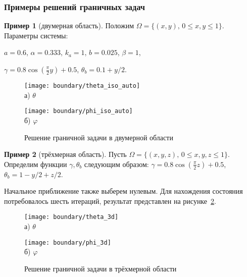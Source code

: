 \begin{frame}
    \frametitle{Примеры решений граничных задач}
    \textbf{Пример 1} (двумерная область).
    Положим $\Omega=\{(x,y),\, 0 \leq x,y \leq 1 \}$.
    Параметры системы:

    $a = 0.6$,
    $\alpha = 0.333$,
    $k_a = 1$,
    $b = 0.025$,
    $\beta = 1$,

    $\gamma = 0.8 \cos\left(\frac{\pi}{2} y\right) + 0.5$,
    $\theta_b = 0.1 + y / 2$.
    \begin{figure}[h!t]
        \begin{minipage}[b][][b]{0.49\linewidth}
            \centering
            \texttt{[image: boundary/theta\_iso\_auto]} \\ а) $\theta$
        \end{minipage}
        \hfill
        \begin{minipage}[b][][b]{0.49\linewidth}
            \centering
            \texttt{[image: boundary/phi\_iso\_auto]} \\ б) $\varphi$
        \end{minipage}
        \caption{Решение граничной задачи в двумерной области}
        \label{fig:4_1:boundary}
    \end{figure}
\end{frame}

\begin{frame}

    \textbf{Пример 2} (трёхмерная область).
    Пусть $\Omega=\{(x,y,z),\, 0 \leq x,y,z \leq 1 \}$.
    Определим функции $\gamma, \theta_b$ следующим образом:
    $\gamma = 0.8 \cos\left(\frac{\pi}{2} z\right) + 0.5$,
    $\theta_b = 1- y / 2 + z /2$.

    Начальное приближение также выберем нулевым.
    Для нахождения состояния потребовалось шесть итераций,
    результат представлен на рисунке~\ref{fig:4_1:boundary_3d}.
    \begin{figure}[h!t]
        \begin{minipage}[b][][b]{0.49\linewidth}
            \centering
            \texttt{[image: boundary/theta\_3d]} \\ а) $\theta$
        \end{minipage}
        \hfill
        \begin{minipage}[b][][b]{0.49\linewidth}
            \centering
            \texttt{[image: boundary/phi\_3d]} \\ б) $\varphi$
        \end{minipage}
        \caption{Решение граничной задачи в трёхмерной области}
        \label{fig:4_1:boundary_3d}
    \end{figure}
\end{frame}

